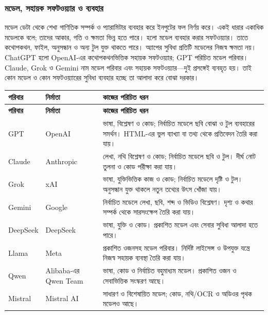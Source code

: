 \subsubsection{মডেল, সহায়ক সফটওয়্যার ও ব্যবহার}
মডেল ডেটা থেকে শেখা গাণিতিক সম্পর্ক ও প্যারামিটার ব্যবহার করে ইনপুটের ফল নির্ণয় করে। একই ধারার একাধিক মডেলকে  বলে; তাদের আকার, গতি ও ক্ষমতা ভিন্ন হতে পারে।  হলো মডেল ব্যবহার করার সফটওয়্যার। তাতে কথোপকথন, ফাইল, অনুসন্ধান ও অন্য টুল যুক্ত থাকতে পারে। অ্যাপের সুবিধা প্রতিটি মডেলের নিজস্ব ক্ষমতা নয়।
ChatGPT হলো OpenAI-এর কথোপকথনভিত্তিক সহায়ক সফটওয়্যার; GPT পরিচিত মডেল পরিবার। Claude, Grok ও Gemini নাম মডেল পরিবার এবং সহায়ক সফটওয়্যার---দুই প্রসঙ্গেই ব্যবহৃত হয়। তাই কোন মডেল ও কোন সফটওয়্যারের সুবিধা ব্যবহার হচ্ছে তা আলাদা করে বোঝা দরকার।
\begin{compacttable}
\begin{longtable}{|p{}|p{}|p{}|}
\hline\textbf{পরিবার} & \textbf{নির্মাতা} & \textbf{কাজের পরিচিত ধরন}\\\hline\endfirsthead
\hline\textbf{পরিবার} & \textbf{নির্মাতা} & \textbf{কাজের পরিচিত ধরন}\\\hline\endhead
GPT & OpenAI & ভাষা, বিশ্লেষণ ও কোড; নির্বাচিত মডেলে ছবি বোঝা ও টুল ব্যবহারের সমর্থন। HTML-এর ভুল ব্যাখ্যা বা তথ্য থেকে প্রতিবেদন তৈরি করা যায়।\\\hline
Claude & Anthropic & লেখা, নথি বিশ্লেষণ ও কোড; নির্বাচিত মডেলে ছবি ও টুল। দীর্ঘ নোট তুলনা ও কোড পরীক্ষা করা যায়।\\\hline
Grok & xAI & ভাষা, যুক্তিভিত্তিক কাজ ও কোড; নির্বাচিত মডেলে দৃষ্টি ও টুল। অনুসন্ধান যুক্ত থাকলে নতুন তথ্যের উৎস খোঁজা যায়।\\\hline
Gemini & Google & নির্বাচিত মডেলে লেখা, ছবি, শব্দ ও ভিডিও বিশ্লেষণ। দৃশ্য ও কথার সম্পর্ক থেকে সারসংক্ষেপ তৈরি করা যায়।\\\hline
DeepSeek & DeepSeek & ভাষা, যুক্তি ও কোড। প্রকাশিত মডেল এবং সেবার সুবিধা আলাদা হতে পারে।\\\hline
Llama & Meta & প্রকাশিত ওজনসহ মডেল পরিবার। নির্দিষ্ট লাইসেন্স ও উপযুক্ত যন্ত্রে নিজস্ব সহায়ক ব্যবস্থা তৈরি করা যায়।\\\hline
Qwen & Alibaba-এর Qwen Team & ভাষা, কোড ও নির্বাচিত বহুমাধ্যম মডেল। প্রকাশিত ওজন ও সেবাভিত্তিক সংস্করণ আছে।\\\hline
Mistral & Mistral AI & সাধারণ ও বিশেষায়িত মডেল; কোড, নথি/OCR ও অডিওর পৃথক মডেলও আছে।\\\hline
\end{longtable}
\end{compacttable}
